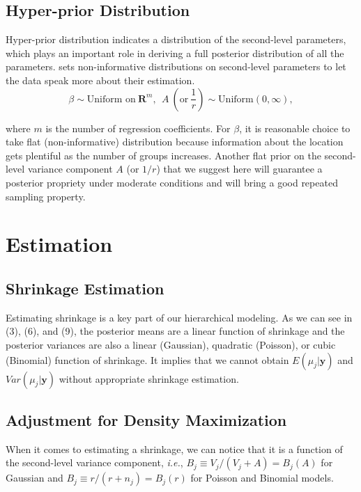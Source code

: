 \documentclass[article]{jss}
\begin{document}
\subsection[Hyper-prior Distribution]{Hyper-prior Distribution}
Hyper-prior distribution indicates a distribution of the second-level parameters, which plays an important role in deriving a full posterior distribution of all the parameters.  sets non-informative distributions on second-level parameters to let the data speak more about their estimation.
\begin{equation}
\beta \sim \textrm{Uniform on}~ \mathbf{R}^{m},~~A ~(\textrm{or}~ \frac{1}{r})\sim \textrm{Uniform}(0, \infty),
\end{equation}

where $m$ is the number of regression coefficients. For $\beta$, it is reasonable choice to take flat (non-informative) distribution because information about the location gets plentiful as the number of groups increases. Another flat prior on the second-level variance component  $A$ (or $1/r$) that we suggest here will guarantee a posterior propriety under moderate conditions and will bring a good repeated sampling property.
\\

\section[Estimation]{Estimation}

\subsection[Shrinkage Estimation]{Shrinkage Estimation}
Estimating shrinkage is a key part of our hierarchical modeling. As we can see in (3), (6), and (9), the posterior means are a linear function of shrinkage and the posterior variances are also a linear (Gaussian), quadratic (Poisson), or cubic (Binomial) function of shrinkage. It implies that we cannot obtain $E(\mu_{j}\vert \textbf{y})$ and $Var(\mu_{j}\vert \textbf{y})$ without appropriate shrinkage estimation.

\subsection[ADM]{Adjustment for Density Maximization}
When it comes to estimating a shrinkage, we can notice that it is a function of the second-level variance component, \emph{i.e.}, $B_{j}\equiv V_{j}/(V_{j}+A)=B_{j}(A)$ for Gaussian and $B_{j}\equiv r/(r+n_{j})=B_{j}(r)$ for Poisson and Binomial models.
\\
\end{document}
